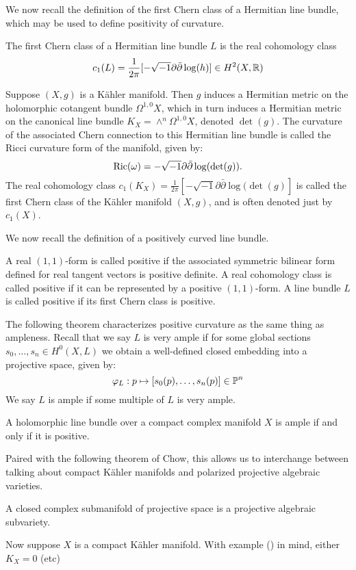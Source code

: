 We now recall the definition of the first Chern class of a Hermitian line bundle, which may be used to define positivity of curvature. 
\begin{definition}
The first Chern class of a Hermitian line bundle \(L\) is the real cohomology class
\[
c_1(L) = \frac{1}{2 \pi} [  - \sqrt{-1} \partial \bar{\partial} \log(h) ] \in H^2(X, \mathbb{R})
\]
\end{definition}
\begin{example}
Suppose \((X,g)\) is a K\"ahler manifold. Then \(g\) induces a Hermitian metric on the holomorphic cotangent bundle \(\Omega^{1,0} X\), which in turn induces a Hermitian metric on the canonical line bundle \(K_X = \wedge^{n} \Omega^{1,0} X\), denoted \(\det(g)\). The curvature of the associated Chern connection to this Hermitian line bundle is called the Ricci curvature form of the manifold, given by:
\[
\mathop{\rm Ric}\nolimits(\omega) = - \sqrt{-1} \partial \bar{\partial} \log( \det(g) ).
\]
The real cohomology class \(c_1(K_X) = \frac{1}{2 \pi} [  - \sqrt{-1} \partial \bar{\partial} \log( \det(g) ]  \) is called the first Chern class of the K\"ahler manifold \((X,g)\), and is often denoted just by \(c_1(X)\).
\end{example}
We now recall the definition of a positively curved line bundle.
\begin{definition}
A real \((1,1)\)-form is called positive if the associated symmetric bilinear form defined for real tangent vectors is positive definite. A real cohomology class is called positive if it can be represented by a positive \((1,1)\)-form. A line bundle \(L\) is called positive if its first Chern class is positive.
\end{definition}
The following theorem characterizes positive curvature as the same thing as ampleness. Recall that we say \(L\) is very ample if for some global sections \(s_0,\dots,s_n \in H^0(X,L)\) we obtain a well-defined closed embedding into a projective space, given by:
\[
\varphi_L: p \mapsto [s_0(p),\dots,s_n(p)] \in \mathbb{P}^n
\]
We say \(L\) is ample if some multiple of \(L\) is very ample.
\begin{theorem}
A holomorphic line bundle over a compact complex manifold \(X\) is ample if and only if it is positive.
\end{theorem}
Paired with the following theorem of Chow, this allows us to interchange between talking about compact K\"ahler manifolds and polarized projective algebraic varieties.
\begin{theorem}
A closed complex submanifold of projective space is a projective algebraic subvariety.
\end{theorem}
Now suppose \(X\) is a compact K\"ahler manifold. With example () in mind, either \(K_X = 0\) (etc)
